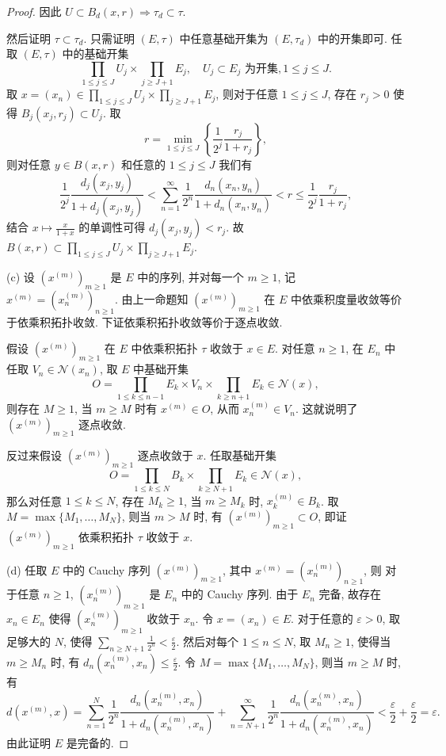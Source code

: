 \documentclass{mathexercise}
\begin{document}
\begin{proof}
    因此 $U\subset B_d(x,r)\Rightarrow\tau_d\subset\tau$.
    
    然后证明 $\tau\subset\tau_d$. 只需证明 $(E,\tau)$ 中任意基础开集为 $(E,\tau_d)$ 中的开集即可.
    任取 $(E,\tau)$ 中的基础开集
    \[\prod_{1\leq j\leq J}U_j\times\prod_{j\geq J+1}E_j,\quad U_j\subset E_j\text{\ 为开集},1\leq j\leq J.\]
    取 $x=(x_n)\in\prod_{1\leq j\leq J}U_j\times\prod_{j\geq J+1}E_j$, 则对于任意 $1\leq j\leq J$,
    存在 $r_j>0$ 使得 $B_j(x_j,r_j)\subset U_j$. 取
    \[r=\min_{1\leq j\leq J}\left\{\frac{1}{2^j}\frac{r_j}{1+r_j}\right\},\]
    则对任意 $y\in B(x,r)$ 和任意的 $1\leq j\leq J$ 我们有
    \[\frac{1}{2^j}\frac{d_j(x_j,y_j)}{1+d_j(x_j,y_j)}<\sum_{n=1}^{\infty}\frac{1}{2^n}\frac{d_n(x_n,y_n)}{1+d_n(x_n,y_n)}<r\leq\frac{1}{2^j}\frac{r_j}{1+r_j},\]
    结合 $x\mapsto\frac{x}{1+x}$ 的单调性可得 $d_j(x_j,y_j)<r_j$. 故 $B(x,r)\subset\prod_{1\leq j\leq J}U_j\times\prod_{j\geq J+1}E_j$.
    
    (c) 设 $(x^{(m)})_{m\geq 1}$ 是 $E$ 中的序列, 并对每一个 $m\geq 1$, 记 $x^{(m)}=(x_n^{(m)})_{n\geq 1}$.
    由上一命题知 $(x^{(m)})_{m\geq 1}$ 在 $E$ 中依乘积度量收敛等价于依乘积拓扑收敛.
    下证依乘积拓扑收敛等价于逐点收敛.
    
    假设 $(x^{(m)})_{m\geq 1}$ 在 $E$ 中依乘积拓扑 $\tau$ 收敛于 $x\in E$.
    对任意 $n\geq 1$, 在 $E_n$ 中任取 $V_n\in\mathcal{N}(x_n)$, 取 $E$ 中基础开集
    \[O=\prod_{1\leq k\leq n-1}E_k\times V_n\times\prod_{k\geq n+1}E_k\in\mathcal{N}(x),\]
    则存在 $M\geq 1$, 当 $m\geq M$ 时有 $x^{(m)}\in O$, 从而 $x_n^{(m)}\in V_n$. 这就说明了 $(x^{(m)})_{m\geq 1}$
    逐点收敛.
    
    反过来假设 $(x^{(m)})_{m\geq 1}$ 逐点收敛于 $x$. 任取基础开集
    \[O=\prod_{1\leq k\leq N}B_k\times\prod_{k\geq N+1}E_k\in\mathcal{N}(x),\]
    那么对任意 $1\leq k\leq N$, 存在 $M_k\geq 1$, 当 $m\geq M_k$ 时, $x_k^{(m)}\in B_k$.
    取 $M=\max\{M_1,\dots, M_N\}$, 则当 $m>M$ 时, 有 $(x^{(m)})_{m\geq 1}\subset O$,
    即证 $(x^{(m)})_{m\geq 1}$ 依乘积拓扑 $\tau$ 收敛于 $x$.
    
    (d) 任取 $E$ 中的 Cauchy 序列 $(x^{(m)})_{m\geq 1}$, 其中 $x^{(m)}=(x_n^{(m)})_{n\geq 1}$, 则
    对于任意 $n\geq 1$, $(x_n^{(m)})_{m\geq 1}$ 是 $E_n$ 中的 Cauchy 序列.
    由于 $E_n$ 完备, 故存在 $x_n\in E_n$ 使得 $(x_n^{(m)})_{m\geq 1}$ 收敛于 $x_n$.
    令 $x=(x_n)\in E$. 对于任意的 $\varepsilon>0$, 取足够大的 $N$, 使得 $\sum_{n\geq N+1}\frac{1}{2^n}<\frac{\varepsilon}{2}$.
    然后对每个 $1\leq n\leq N$, 取 $M_n\geq 1$, 使得当 $m\geq M_n$ 时, 有 $d_n(x_n^{(m)},x_n)\leq\frac{\varepsilon}{2}$.
    令 $M=\max\{M_1,\dots,M_N\}$, 则当 $m\geq M$ 时, 有
    \[d(x^{(m)},x)=\sum_{n=1}^N\frac{1}{2^n}\frac{d_n(x_n^{(m)},x_n)}{1+d_n(x_n^{(m)},x_n)}+\sum_{n=N+1}^{\infty}\frac{1}{2^n}\frac{d_n(x_n^{(m)},x_n)}{1+d_n(x_n^{(m)},x_n)}<\frac{\varepsilon}{2}+\frac{\varepsilon}{2}=\varepsilon.\]
    由此证明 $E$ 是完备的.
    

\end{proof}
\end{document}
